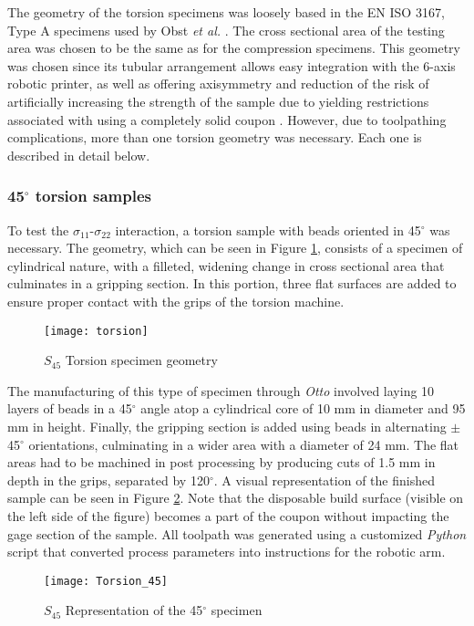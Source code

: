 \documentclass[main.tex]{subfiles}
\begin{document}
The geometry of the torsion specimens was loosely based in the EN ISO 3167, Type A specimens used by Obst \emph{et al.} \cite{Obst2018}. The cross sectional area of the testing area was chosen to be the same as for the compression specimens. This geometry was chosen since its tubular arrangement allows easy integration with the 6-axis robotic printer, as well as offering axisymmetry and reduction of the risk of artificially increasing the strength of the sample due to yielding restrictions associated with using a completely solid coupon \cite{Obst2018}. However, due to toolpathing complications, more than one torsion geometry was necessary. Each one is described in detail below.  

\subsubsection{45$^\circ$ torsion samples}

To test the $\sigma_{11}$-$\sigma_{22}$ interaction, a torsion sample with beads oriented in 45$^\circ$ was necessary. The geometry, which can be seen in Figure \ref{fig:tors45}, consists of a specimen of cylindrical nature, with a filleted, widening change in cross sectional area that culminates in a gripping section. In this portion, three flat surfaces are added to ensure proper contact with the grips of the torsion machine. 
\begin{figure}[h]
	\center
	\texttt{[image: torsion]}
	\caption{$S_{45}$ Torsion specimen geometry} \label{fig:tors45}
\end{figure}

The manufacturing of this type of specimen through \emph{Otto} involved laying 10 layers of beads in a 45$^\circ$ angle atop a cylindrical core of 10 mm in diameter and 95 mm in height. Finally, the gripping section is added using beads in alternating  $\pm$45$^\circ$ orientations, culminating in a wider area with a diameter of 24 mm. The flat areas had to be machined in post processing by producing cuts of 1.5 mm in depth in the grips, separated by 120$^\circ$. A visual representation of the finished sample can be seen in Figure \ref{fig:tors45d}. Note that the disposable build surface (visible on the left side of the figure) becomes a part of the coupon without impacting the gage section of the sample. All toolpath was generated using a customized  \emph{Python} script that converted process parameters into instructions for the robotic arm.
\begin{figure}[!htbp]
	\center
	\texttt{[image: Torsion\_45]}
	\caption{$S_{45}$ Representation of the 45$^\circ$ specimen} \label{fig:tors45d}
\end{figure}
\end{document}
